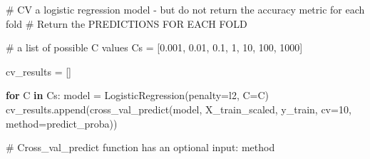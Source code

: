 \documentclass[
  letterpaper,
  DIV=11,
  numbers=noendperiod]{scrreprt}
\newenvironment{Shaded}{\begin{snugshade}}{\end{snugshade}}
\newcommand{\CommentTok}[1]{\textcolor[rgb]{0.37,0.37,0.37}{#1}}
\newcommand{\ControlFlowTok}[1]{\textcolor[rgb]{0.00,0.23,0.31}{\textbf{#1}}}
\newcommand{\DecValTok}[1]{\textcolor[rgb]{0.68,0.00,0.00}{#1}}
\newcommand{\FloatTok}[1]{\textcolor[rgb]{0.68,0.00,0.00}{#1}}
\newcommand{\KeywordTok}[1]{\textcolor[rgb]{0.00,0.23,0.31}{\textbf{#1}}}
\newcommand{\NormalTok}[1]{\textcolor[rgb]{0.00,0.23,0.31}{#1}}
\newcommand{\OperatorTok}[1]{\textcolor[rgb]{0.37,0.37,0.37}{#1}}
\newcommand{\StringTok}[1]{\textcolor[rgb]{0.13,0.47,0.30}{#1}}
\begin{document}
\begin{Shaded}
\begin{Highlighting}[]
\CommentTok{\# CV a logistic regression model {-} but do not return the accuracy metric for each fold}
    \CommentTok{\# Return the PREDICTIONS FOR EACH FOLD}

\CommentTok{\# a list of possible C values}
\NormalTok{Cs }\OperatorTok{=}\NormalTok{ [}\FloatTok{0.001}\NormalTok{, }\FloatTok{0.01}\NormalTok{, }\FloatTok{0.1}\NormalTok{, }\DecValTok{1}\NormalTok{, }\DecValTok{10}\NormalTok{, }\DecValTok{100}\NormalTok{, }\DecValTok{1000}\NormalTok{]}

\NormalTok{cv\_results }\OperatorTok{=}\NormalTok{ []}

\ControlFlowTok{for}\NormalTok{ C }\KeywordTok{in}\NormalTok{ Cs:}
\NormalTok{    model }\OperatorTok{=}\NormalTok{ LogisticRegression(penalty}\OperatorTok{=}\StringTok{\textquotesingle{}l2\textquotesingle{}}\NormalTok{, C}\OperatorTok{=}\NormalTok{C)}
\NormalTok{    cv\_results.append(cross\_val\_predict(model, X\_train\_scaled, y\_train, cv}\OperatorTok{=}\DecValTok{10}\NormalTok{, method}\OperatorTok{=}\StringTok{\textquotesingle{}predict\_proba\textquotesingle{}}\NormalTok{))}
    
\CommentTok{\# Cross\_val\_predict function has an optional input: method}
\end{Highlighting}
\end{Shaded}
\end{document}
